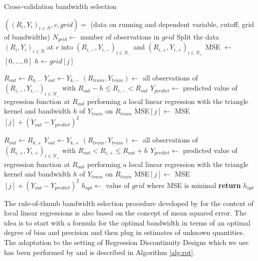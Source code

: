 \begin{algorithm}[H]
	\caption{Cross-validation bandwidth selection}\label{alg:cv}
	\begin{algorithmic}[1]
		\Require $((R_{i}, Y_{i})_{i \in N}, c, grid) =$ (data on running and dependent variable, cutoff, grid of bandwidths)
		\State $N_{grid} \gets$ number of observations in $grid$
		\State Split the data $(R_{i}, Y_{i})_{i \in N}$ at $c$ into $(R_{i, -}, Y_{i, -})_{i \in N_{-}}$ and $(R_{i, +}, Y_{i, +})_{i \in N_{+}}$
		\State MSE $\gets$ $\left[ 0, \dots, 0 \right]$
		\State $h \gets grid[j]$

		\State $R_{out} \gets R_{k, -}$
		\State $Y_{out} \gets Y_{k, -}$
		\State $\left(R_{train}, Y_{train}\right) \gets$ all observations of $(R_{i, -}, Y_{i, -})_{i \in N_{-}}$ with $R_{out}-h \leq R_{i, -} < R_{out}$
		\State $Y_{predict} \gets$ predicted value of regression function at $R_{out}$ performing a local linear \newline
		\mbox{} regression with the triangle kernel and bandwidth $h$ of $Y_{train}$ on $R_{train}$
		\State MSE$[j] \gets$ MSE$[j] + \left( Y_{out} - Y_{predict} \right)^{2}$
		\EndFor

		\State $R_{out} \gets R_{k, +}$
		\State $Y_{out} \gets Y_{k, +}$
		\State $\left(R_{train}, Y_{train}\right) \gets$ all observations of  $(R_{i, +}, Y_{i, +})_{i \in N_{+}}$ with $R_{out} < R_{i, +} \leq R_{out}+h $
		\State $Y_{predict} \gets$ predicted value of regression function at $R_{out}$ performing a local linear \newline
		\mbox{} regression with the triangle kernel and bandwidth $h$ of $Y_{train}$ on $R_{train}$
		\State MSE$[j] \gets$ MSE$[j] + \left( Y_{out} - Y_{predict} \right)^{2}$
		\EndFor
		\EndFor
		\State $h_{opt} \gets$ value of $grid$ where MSE is minimal
		\State \textbf{return} $h_{opt}$
	\end{algorithmic}
\end{algorithm}

The rule-of-thumb bandwidth selection procedure developed by \cite{fan_gij} for the context of local linear regressions is also based on the concept of mean squared error. The idea is to start with a formula for the optimal bandwidth in terms of an optimal degree of bias and precision and then plug in estimates of unknown quantities. The adaptation to the setting of Regression Discontinuity Designs which we use has been performed by \cite{imbens_kalyanaraman} and is described in Algorithm \ref{alg:rot}.

